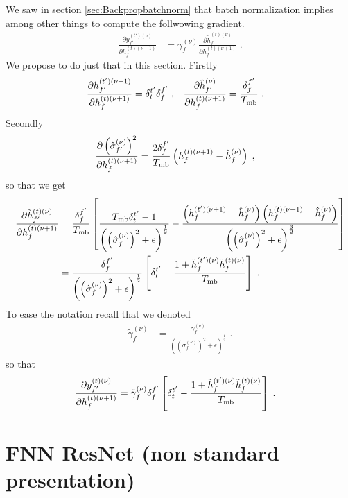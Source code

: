 \begin{subappendices}
We saw in section \ref{sec:Backpropbatchnorm} that batch normalization implies among other things to compute the follwowing gradient.
\begin{align}
\frac{\partial y^{(t')(\nu)}_{f'}}{\partial h_{f}^{(t)(\nu+1)}}&=
%
\gamma^{(\nu)}_f\frac{\partial \tilde{h}_{f'}^{(t)(\nu)}}{\partial h_{f}^{(t)(\nu+1)}}\;.
\end{align}
We propose to do just that in this section. Firstly 
\begin{align}
\frac{\partial h^{(t')(\nu+1)}_{f'}}{\partial h_{f}^{(t)(\nu+1)}}&=\delta^{t'}_t\delta^{f'}_f\;,&
%
\frac{\partial \hat{h}_{f'}^{(\nu)}}{\partial h_{f}^{(t)(\nu+1)}}&=\frac{\delta^{f'}_f}{T_{{\rm mb}}}\;.
\end{align}
Secondly
\begin{align}
\frac{\partial \left(\hat{\sigma}_{f'}^{(\nu)}\right)^2}{\partial h_{f}^{(t)(\nu+1)}}&=
%
\frac{2\delta^{f'}_f}{T_{{\rm mb}}}\left(h_{f}^{(t)(\nu+1)}-\hat{h}_{f}^{(\nu)}\right)\;,
\end{align}
so that we get
\begin{align}
\frac{\partial \tilde{h}_{f'}^{(t)(\nu)}}{\partial h_{f}^{(t)(\nu+1)}}&=
%
\frac{\delta^{f'}_f}{T_{{\rm mb}}}\left[\frac{T_{{\rm mb}}\delta^{t'}_t-1}
%
{\left(\left(\hat{\sigma}_{f}^{(\nu)}\right)^2+\epsilon\right)^\frac12}-
%
\frac{\left(h_{f}^{(t')(\nu+1)}-\hat{h}_{f}^{(\nu)}\right)\left(h_{f}^{(t)(\nu+1)}-\hat{h}_{f}^{(\nu)}\right)}
%
{\left(\left(\hat{\sigma}_{f}^{(\nu)}\right)^2+\epsilon\right)^\frac32}\right]\notag\\
%
&=\frac{\delta^{f'}_f}{\left(\left(\hat{\sigma}_{f}^{(\nu)}\right)^2+\epsilon\right)^\frac12}
%
\left[\delta^{t'}_t-
%
\frac{1+\tilde{h}_{f}^{(t')(\nu)}\tilde{h}_{f}^{(t)(\nu)}}{T_{{\rm mb}}}\right]\;.
\end{align}
To ease the notation recall that we denoted
\begin{align}
\tilde{\gamma}^{(\nu)}_f&=
%
\frac{\gamma^{(\nu)}_f}{\left(\left(\hat{\sigma}_{f}^{(\nu)}\right)^2+\epsilon\right)^\frac12}\;.
\end{align}
%
%
so that
\begin{align}
\frac{\partial y_{f'}^{(t)(\nu)}}{\partial h_{f}^{(t)(\nu+1)}}&=
%
\tilde{\gamma}^{(\nu)}_f \delta^{f'}_f\left[\delta^{t'}_t-
%
\frac{1+\tilde{h}_{f}^{(t')(\nu)}\tilde{h}_{f}^{(t)(\nu)}}{T_{{\rm mb}}}\right]\;.
\end{align}



\section{FNN ResNet (non standard presentation)} \label{sec:ResnetFNN}


\end{subappendices}
